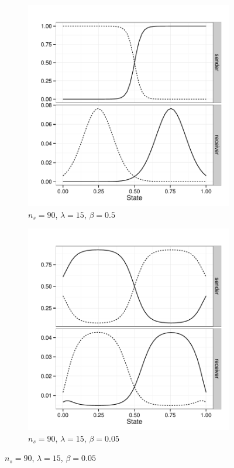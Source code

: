 \documentclass[fleqn,reqno,10pt]{article}
\newcommand{\toler}{\ensuremath{\beta}} %
\newcommand{\ns}{\ensuremath{n_s}} %
\begin{document}
\begin{figure}
  \centering
  
  \begin{subfigure}[]{0.45\textwidth}
    \includegraphics[width=\textwidth]{plots/exampleStratQRE_tolerance05.pdf}
    \caption{$\ns = 90$, $\lambda = 15$, $\toler = 0.5$}
    \label{fig:exampleQRE_stratsA}
  \end{subfigure}
  \hfill
  \begin{subfigure}[]{0.45\textwidth}
    \includegraphics[width=\textwidth]{plots/exampleStratQRE_tolerance005.pdf}
    \caption{$\ns = 90$, $\lambda = 15$, $\toler = 0.05$}
    \label{fig:exampleQRE_stratsB}
  \end{subfigure}


\end{figure}
\end{document}
